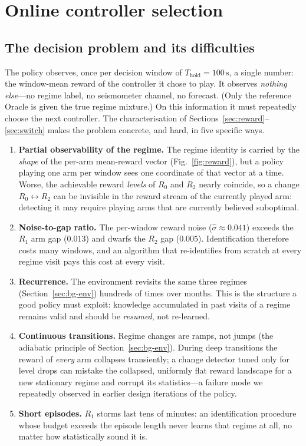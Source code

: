 \documentclass[11pt,a4paper]{article}
\newcommand{\SI}[2]{#1\,\text{#2}}
\begin{document}
\section{Online controller selection}\label{sec:bandit}

\subsection{The decision problem and its difficulties}\label{sec:ba-problem}
The policy observes, once per decision window of $T_{\mathrm{hold}}=\SI{100}{s}$,
a single number: the window-mean reward of the controller it chose to play. It
observes \emph{nothing else}---no regime label, no seismometer channel, no
forecast. (Only the reference Oracle is given the true regime mixture.) On this
information it must repeatedly choose the next controller. The
characterisation of Sections~\ref{sec:reward}--\ref{sec:switch} makes the
problem concrete, and hard, in five specific ways.

\begin{enumerate}
  \item \textbf{Partial observability of the regime.} The regime identity is
  carried by the \emph{shape} of the per-arm mean-reward vector
  (Fig.~\ref{fig:reward}), but a policy playing one arm per window sees one
  coordinate of that vector at a time. Worse, the achievable reward
  \emph{levels} of $R_0$ and $R_2$ nearly coincide, so a change $R_0
  \!\leftrightarrow\! R_2$ can be invisible in the reward stream of the
  currently played arm: detecting it may require playing arms that are
  currently believed suboptimal.
  \item \textbf{Noise-to-gap ratio.} The per-window reward noise
  ($\hat\sigma \approx 0.041$) exceeds the $R_1$ arm gap ($0.013$) and dwarfs
  the $R_2$ gap ($0.005$). Identification therefore costs many windows, and an
  algorithm that re-identifies from scratch at every regime visit pays this
  cost at every visit.
  \item \textbf{Recurrence.} The environment revisits the same three regimes
  (Section~\ref{sec:bg-env}) hundreds of times over months. This is the
  structure a good policy must exploit: knowledge accumulated in past visits
  of a regime remains valid and should be \emph{resumed}, not re-learned.
  \item \textbf{Continuous transitions.} Regime changes are ramps, not jumps
  (the adiabatic principle of Section~\ref{sec:bg-env}). During deep
  transitions the reward of \emph{every} arm collapses transiently; a
  change detector tuned only for level drops can mistake the collapsed,
  uniformly flat reward landscape for a new stationary regime and corrupt its
  statistics---a failure mode we repeatedly observed in earlier design
  iterations of the policy.
  \item \textbf{Short episodes.} $R_1$ storms last tens of minutes: an
  identification procedure whose budget exceeds the episode length never
  learns that regime at all, no matter how statistically sound it is.
\end{enumerate}
\end{document}

